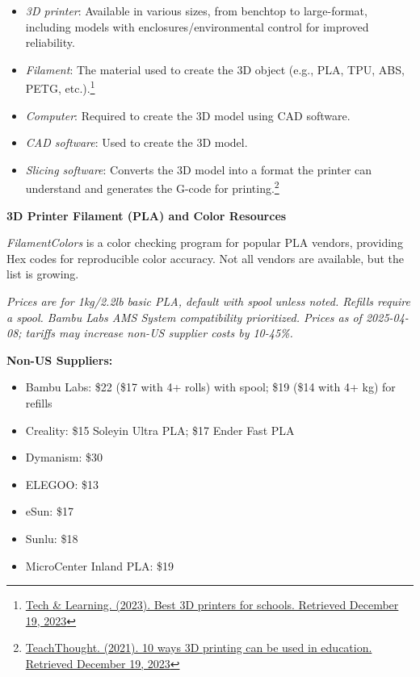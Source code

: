 \begin{itemize}
    \item \emph{3D printer}: Available in various sizes, from benchtop to large-format, including models with enclosures/environmental control for improved reliability.
    \item \emph{Filament}: The material used to create the 3D object (e.g., PLA, TPU, ABS, PETG, etc.).\footnote{\href{http://www.techlearning.com/buying-guides/best-3d-printers-for-schools}{Tech \& Learning. (2023). Best 3D printers for schools. Retrieved December 19, 2023}}
    \item \emph{Computer}: Required to create the 3D model using CAD software.
    \item \emph{CAD software}: Used to create the 3D model.
    \item \emph{Slicing software}: Converts the 3D model into a format the printer can understand and generates the G-code for printing.\footnote{\href{http://www.teachthought.com/technology/ways-3d-printing-can-be-used-in-education/}{TeachThought. (2021). 10 ways 3D printing can be used in education. Retrieved December 19, 2023}}
\end{itemize}

\textbf{3D Printer Filament (PLA) and Color Resources}

\emph{FilamentColors} is a color checking program for popular PLA vendors, providing Hex codes for reproducible color accuracy. Not all vendors are available, but the list is growing.

\textit{Prices are for 1kg/2.2lb basic PLA, default with spool unless noted. Refills require a spool. Bambu Labs AMS System compatibility prioritized. Prices as of 2025-04-08; tariffs may increase non-US supplier costs by 10-45\%.}

\textbf{Non-US Suppliers:}
\begin{itemize}
    \item Bambu Labs: \$22 (\$17 with 4+ rolls) with spool; \$19 (\$14 with 4+ kg) for refills
    \item Creality: \$15 Soleyin Ultra PLA; \$17 Ender Fast PLA
    \item Dymanism: \$30
    \item ELEGOO: \$13
    \item eSun: \$17
    \item Sunlu: \$18
    \item MicroCenter Inland PLA: \$19
\end{itemize}


